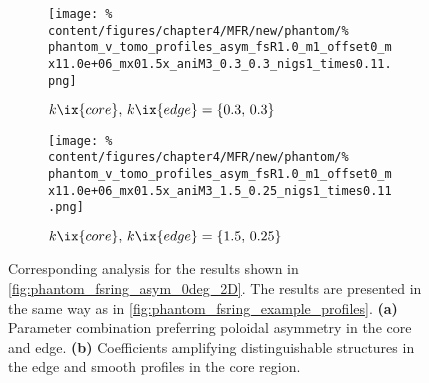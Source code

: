 %
                \begin{figure}[t]%
                    \centering%
                    \begin{subfigure}{\textwidth}%
                        \centering%
                        \texttt{[image: \%
                            content/figures/chapter4/MFR/new/phantom/\%
                            phantom\_v\_tomo\_profiles\_asym\_fsR1.0\_m1\_offset0\_mx11.0e+06\_mx01.5x\_aniM3\_0.3\_0.3\_nigs1\_times0.11.png]}%
                        \caption{$k\ix{core},\,k\ix{edge}=\left\{0.3,\,0.3\right\}$}%
                    \end{subfigure}%
                    \newline%
                    \begin{subfigure}{\textwidth}%
                        \centering%
                        \texttt{[image: \%
                            content/figures/chapter4/MFR/new/phantom/\%
                            phantom\_v\_tomo\_profiles\_asym\_fsR1.0\_m1\_offset0\_mx11.0e+06\_mx01.5x\_aniM3\_1.5\_0.25\_nigs1\_times0.11.png]}%
                        \caption{$k\ix{core},\,k\ix{edge}=\left\{1.5,\,0.25\right\}$}%
                    \end{subfigure}%
                    \caption{Corresponding analysis for the results shown in \cref{fig:phantom_fsring_asym_0deg_2D}. The results are presented in the same way as in \cref{fig:phantom_fsring_example_profiles}. \textbf{(a)} Parameter combination preferring poloidal asymmetry in the core and edge. \textbf{(b)} Coefficients amplifying distinguishable structures in the edge and smooth profiles in the core region.}\label{fig:phantom_fsring_asym_0deg_profiles}%
                \end{figure}%
%
